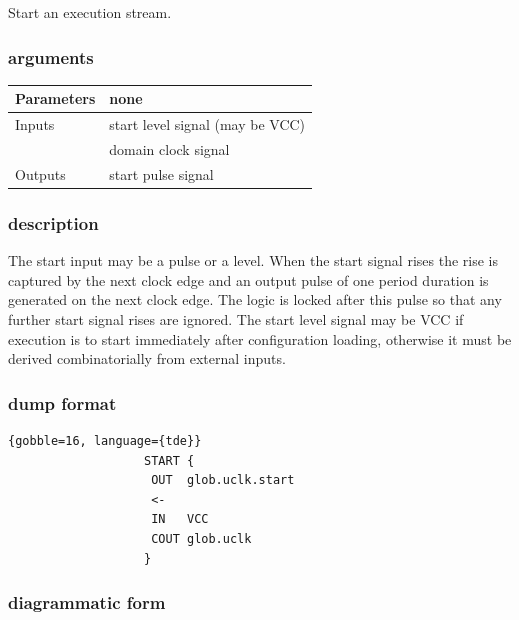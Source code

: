                 Start an execution stream.

            \subsubsection{arguments}
            
                \begin{tabular}{| l | l |}
                \hline
                Parameters  & none \\
                \hline
                Inputs      & start level signal (may be VCC)\\
                            & domain clock signal \\
                \hline
                Outputs     & start pulse signal \\
                \hline
                \end{tabular}

            \subsubsection{description}

                The start input may be a pulse or a level. When the start signal
                rises the rise is captured by the next clock edge and an
                output pulse of one period duration is generated on the next
                clock edge. The logic is locked after this pulse so that
                any further start signal rises are ignored. The
                start level signal may be VCC if execution is to start
                immediately after configuration loading, otherwise it must be
                derived combinatorially from external inputs.

            \subsubsection{dump format}
            
                \begin{lstlisting}{gobble=16, language={tde}}
                   START { 
                    OUT  glob.uclk.start
                    <-
                    IN   VCC
                    COUT glob.uclk
                   }
                \end{lstlisting}

            \subsubsection{diagrammatic form}

